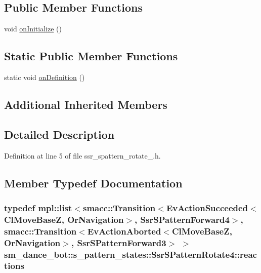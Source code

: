 \subsection*{Public Member Functions}
\begin{DoxyCompactItemize}
\item 
void \hyperlink{structsm__dance__bot_1_1s__pattern__states_1_1SsrSPatternRotate4_a9991d85ab6cc1cb4a45e5d791a270ace}{on\+Initialize} ()
\end{DoxyCompactItemize}
\subsection*{Static Public Member Functions}
\begin{DoxyCompactItemize}
\item 
static void \hyperlink{structsm__dance__bot_1_1s__pattern__states_1_1SsrSPatternRotate4_a6e7b685839f2c58daecde0a333e75d64}{on\+Definition} ()
\end{DoxyCompactItemize}
\subsection*{Additional Inherited Members}


\subsection{Detailed Description}


Definition at line 5 of file ssr\+\_\+spattern\+\_\+rotate\+\_.\+h.



\subsection{Member Typedef Documentation}
\subsubsection[{\texorpdfstring{reactions}{reactions}}]{\setlength{\rightskip}{0pt plus 5cm}typedef mpl\+::list$<${\bf smacc\+::\+Transition}$<$Ev\+Action\+Succeeded$<${\bf Cl\+Move\+BaseZ}, {\bf Or\+Navigation}$>$, {\bf Ssr\+S\+Pattern\+Forward4}$>$, {\bf smacc\+::\+Transition}$<$Ev\+Action\+Aborted$<${\bf Cl\+Move\+BaseZ}, {\bf Or\+Navigation}$>$, {\bf Ssr\+S\+Pattern\+Forward3}$>$ $>$ {\bf sm\+\_\+dance\+\_\+bot\+::s\+\_\+pattern\+\_\+states\+::\+Ssr\+S\+Pattern\+Rotate4\+::reactions}}\hypertarget{structsm__dance__bot_1_1s__pattern__states_1_1SsrSPatternRotate4_a7e2786e660d6435b1d2c699b4d231b1b}{}\label{structsm__dance__bot_1_1s__pattern__states_1_1SsrSPatternRotate4_a7e2786e660d6435b1d2c699b4d231b1b}


